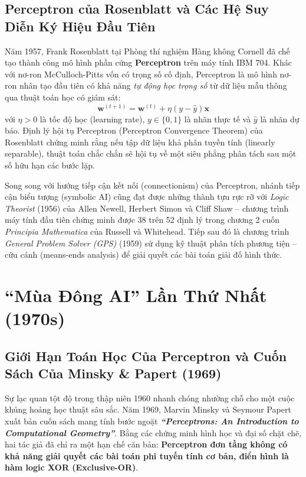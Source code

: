 \documentclass[12pt,a4paper]{report}
\begin{document}
\subsection{Perceptron của Rosenblatt và Các Hệ Suy Diễn Ký Hiệu Đầu Tiên}
Năm 1957, Frank Rosenblatt tại Phòng thí nghiệm Hàng không Cornell đã chế tạo thành công mô hình phần cứng \textbf{Perceptron} trên máy tính IBM 704. Khác với nơ-ron McCulloch-Pitts vốn có trọng số cố định, Perceptron là mô hình nơ-ron nhân tạo đầu tiên có khả năng \textit{tự động học trọng số} từ dữ liệu mẫu thông qua thuật toán học có giám sát:
\begin{equation}
\mathbf{w}^{(t+1)} = \mathbf{w}^{(t)} + \eta (y - \hat{y}) \mathbf{x}
\end{equation}
với $\eta > 0$ là tốc độ học (learning rate), $y \in \{0, 1\}$ là nhãn thực tế và $\hat{y}$ là nhãn dự báo. Định lý hội tụ Perceptron (Perceptron Convergence Theorem) của Rosenblatt chứng minh rằng nếu tập dữ liệu khả phân tuyến tính (linearly separable), thuật toán chắc chắn sẽ hội tụ về một siêu phẳng phân tách sau một số hữu hạn các bước lặp.

Song song với hướng tiếp cận kết nối (connectionism) của Perceptron, nhánh tiếp cận biểu tượng (symbolic AI) cũng đạt được những thành tựu rực rỡ với \textit{Logic Theorist} (1956) của Allen Newell, Herbert Simon và Cliff Shaw -- chương trình máy tính đầu tiên chứng minh được 38 trên 52 định lý trong chương 2 cuốn \textit{Principia Mathematica} của Russell và Whitehead. Tiếp sau đó là chương trình \textit{General Problem Solver (GPS)} (1959) sử dụng kỹ thuật phân tích phương tiện -- cứu cánh (means-ends analysis) để giải quyết các bài toán giải đố hình thức.

\section{“Mùa Đông AI” Lần Thứ Nhất (1970s)}

\subsection{Giới Hạn Toán Học Của Perceptron và Cuốn Sách Của Minsky \& Papert (1969)}
Sự lạc quan tột độ trong thập niên 1960 nhanh chóng nhường chỗ cho một cuộc khủng hoảng học thuật sâu sắc. Năm 1969, Marvin Minsky và Seymour Papert xuất bản cuốn sách mang tính bước ngoặt \textbf{\textit{“Perceptrons: An Introduction to Computational Geometry”}}. Bằng các chứng minh hình học và đại số chặt chẽ, hai tác giả đã chỉ ra một hạn chế căn bản: \textbf{Perceptron đơn tầng không có khả năng giải quyết các bài toán phi tuyến tính cơ bản, điển hình là hàm logic XOR (Exclusive-OR)}.
\end{document}
